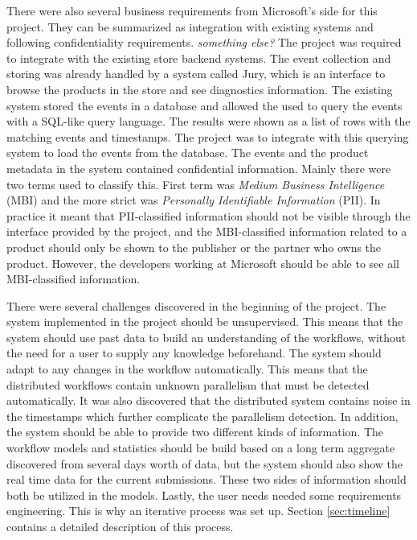\documentclass[english,12pt,a4paper,pdftex,sci,utf8]{aaltothesis}
\theoremstyle{definition}
\newcommand{\nyi}[1]{\noindent\colorbox{nyibg}{\textcolor{nyitext}{\emph{#1}}}}
\begin{document}

There were also several business requirements from Microsoft's side for this project. They can be summarized as integration with existing systems and following confidentiality requirements. \nyi{something else?}
The project was required to integrate with the existing store backend systems. 
The event collection and storing was already handled by a system called Jury, which is an interface to browse the products in the store and see diagnostics information.
The existing system stored the events in a database and allowed the used to query the events with a SQL-like query language. The results were shown as a list of rows with the matching events and timestamps. The project was to integrate with this querying system to load the events from the database.
The events and the product metadata in the system contained confidential information. Mainly there were two terms used to classify this. First term was \textit{Medium Business Intelligence} (MBI) and the more strict was \textit{Personally Identifiable Information} (PII). In practice it meant that PII-classified information should not be visible through the interface provided by the project, and the MBI-classified information related to a product should only be shown to the publisher or the partner who owns the product. However, the developers working at Microsoft should be able to see all MBI-classified information.


There were several challenges discovered in the beginning of the project.
The system implemented in the project should be unsupervised.
This means that the system should use past data to build an understanding of the workflows, without the need for a user to supply any knowledge beforehand.
The system should adapt to any changes in the workflow automatically.
This means that the distributed workflows contain unknown parallelism that must be detected automatically.
It was also discovered that the distributed system contains noise in the timestamps which further complicate the parallelism detection.
In addition, the system should be able to provide two different kinds of information. The workflow models and statistics should be build based on a long term aggregate discovered from several days worth of data, but the system should also show the real time data for the current submissions.
These two sides of information should both be utilized in the models.
Lastly, the user needs needed some requirements engineering. This is why an iterative process was set up. Section \ref{sec:timeline} contains a detailed description of this process.
\end{document}
